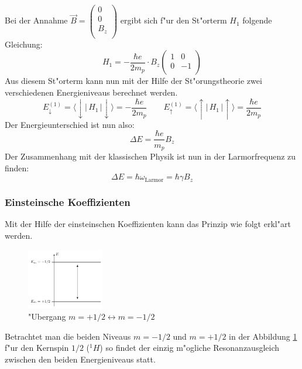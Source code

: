 Bei der Annahme $\vec{B} = \begin{pmatrix}
0 \\
0 \\
B_z \\
\end{pmatrix}$ ergibt sich f"ur den St"orterm $H_1$ folgende Gleichung:
\begin{equation}
H_1 = -\frac{\hbar e}{2m_p} \cdot B_z \begin{pmatrix}
1 & 0 \\
0 & -1 \\
\end{pmatrix}
\end{equation}
Aus diesem St"orterm kann nun mit der Hilfe der St"orungstheorie zwei verschiedenen Energieniveaus berechnet werden.
\begin{equation}
E_\downarrow^{(1)}
=
\langle \downarrow|\, H_1 \,|\downarrow\rangle
=-\frac{\hbar e}{2m_p}
\qquad
E_\uparrow^{(1)}
=
\langle \uparrow|\, H_1 \,|\uparrow\rangle
=\frac{\hbar e}{2m_p}
\end{equation}
Der Energieunterschied ist nun also:
\begin{equation}
\Delta E = \frac{\hbar e}{m_p}B_z
\end{equation}
Der Zusammenhang mit der klassischen Physik ist nun in der Larmorfrequenz  zu finden:
\begin{equation}
\Delta E = \hbar \omega_{\text{Larmor}}=\hbar \gamma B_z
\end{equation}

\subsubsection{Einsteinsche Koeffizienten}
Mit der Hilfe der einsteinschen Koeffizienten kann das Prinzip wie folgt erkl"art werden.
\begin{figure}[h]
	\centering
	\includegraphics[width= 0.3\textwidth]{./mri/pic/einsteinischeKoeffizienten}
	\caption{"Ubergang $m=+1/2 \longleftrightarrow m=-1/2$}
	\label{mri:relax}
\end{figure}
Betrachtet man die beiden Niveaus $m= -1/2$ und $m= +1/2$ in der Abbildung \ref{mri:relax} f"ur den Kernspin $1/2$ ($^1H$) so findet der einzig m"ogliche Resonanzausgleich zwischen den beiden Energieniveaus statt. 

